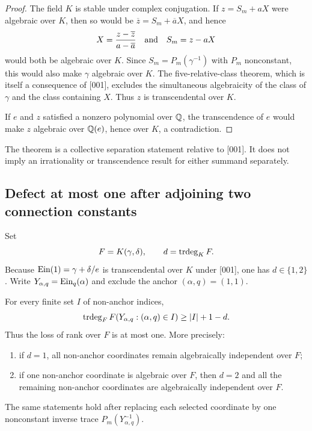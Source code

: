 \begin{proof}
The field \(K\) is stable under complex conjugation.  If
\(z=S_m+aX\) were algebraic over \(K\), then so would be
\(\overline z=S_m+\overline aX\), and hence
\[
 X=\frac{z-\overline z}{a-\overline a}
 \quad\hbox{and}\quad S_m=z-aX
\]
would both be algebraic over \(K\).  Since
\(S_m=P_m(\gamma^{-1})\) with \(P_m\) nonconstant, this would also make
\(\gamma\) algebraic over \(K\).  The five-relative-class theorem, which
is itself a consequence of [001], excludes the simultaneous algebraicity
of the class of \(\gamma\) and the class containing \(X\).  Thus \(z\) is
transcendental over \(K\).

If \(e\) and \(z\) satisfied a nonzero polynomial over \(\mathbb Q\), the
transcendence of \(e\) would make \(z\) algebraic over \(\mathbb Q(e)\), hence
over \(K\), a contradiction.
\end{proof}

\begin{remark}
The theorem is a collective separation statement relative to [001].  It
does not imply an irrationality or transcendence result for either summand
separately.
\end{remark}

\subsection{Defect at most one after adjoining two connection constants}

Set
\[
 F=K(\gamma,\delta),
 \qquad d=\operatorname{trdeg}_KF.
\]
Because \(\operatorname{Ein}(1)=\gamma+\delta/e\) is transcendental over \(K\) under
[001], one has \(d\in\{1,2\}\).  Write
\(Y_{\alpha,q}=\operatorname{Ein}_q(\alpha)\) and exclude the anchor
\((\alpha,q)=(1,1)\).

\begin{theorem}
\label{thm:transfer-two-constant-defect}
For every finite set \(I\) of non-anchor indices,
\[
 \operatorname{trdeg}_FF(Y_{\alpha,q}:(\alpha,q)\in I)
 \ge |I|+1-d.
\]
Thus the loss of rank over \(F\) is at most one.  More precisely:
\begin{enumerate}
\item if \(d=1\), all non-anchor coordinates remain algebraically
independent over \(F\);
\item if one non-anchor coordinate is algebraic over \(F\), then \(d=2\)
and all the remaining non-anchor coordinates are algebraically independent
over \(F\).
\end{enumerate}
The same statements hold after replacing each selected coordinate by one
nonconstant inverse trace \(P_m(Y_{\alpha,q}^{-1})\).
\end{theorem}

